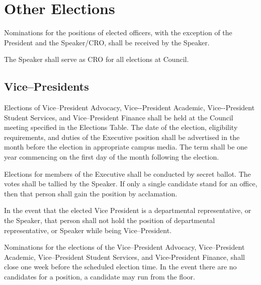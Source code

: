 \newpage

\section{Other Elections}
\begin{longenum}[ label*=\thesubsection.\arabic*., align=left]


 \item Nominations for the positions of elected officers, with the exception of the President and the Speaker/CRO, shall be received by the Speaker. 
 
 \item The Speaker shall serve as CRO for all elections at Council.
\end{longenum}

\subsection{Vice--Presidents}
\begin{longenum}[ label*=\thesubsection.\arabic*., align=left]
	\item Elections of Vice--President Advocacy, Vice-­-President Academic, Vice-­-President Student Services, and Vice--President Finance shall be held at the Council meeting specified in the Elections Table. The date of the election, eligibility requirements, and duties of the Executive position shall be advertised in the month before the election in appropriate campus media. The term shall be one year commencing on the first day of the month following the election. 
	\item Elections for members of the Executive shall be conducted by secret ballot. The votes shall be tallied by the Speaker. If only a single candidate stand for an office, then that person shall gain the position by acclamation.
	\item In the event that the elected Vice President is a departmental representative, or the Speaker, that person shall not hold the position of departmental representative, or Speaker while being Vice--President. 
	\item Nominations for the elections of the Vice--President Advocacy, Vice--President Academic, Vice--President Student Services, and Vice-President Finance, shall close one week before the scheduled election time. In the event there are no candidates for a position, a candidate may run from the floor.
\end{longenum}

